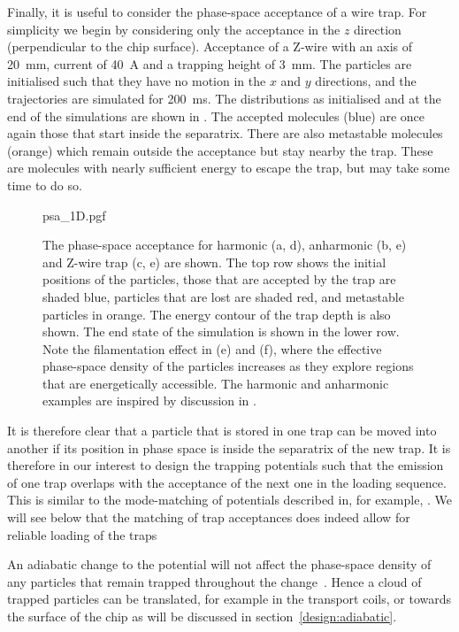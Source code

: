 Finally, it is useful to consider the phase-space acceptance of a wire trap.
For simplicity we begin by considering only the acceptance in the $z$ direction
(perpendicular to the chip surface). Acceptance of a Z-wire with an axis of
\SI{20}{\milli\meter}, current of \SI{40}{\ampere} and a trapping height of
\SI{3}{\milli\meter}. The particles are initialised such that they have no
motion in the $x$ and $y$ directions, and the trajectories are simulated for
\SI{200}{\milli\second}. The distributions as initialised and at the end of the
simulations are shown in . The accepted
molecules (blue) are once again those that start inside the separatrix. There are
also metastable molecules (orange) which remain outside the acceptance but stay
nearby the trap. These are molecules with nearly sufficient energy to escape
the trap, but may take some time to do so.

\begin{figure}[htb]
  \centering
  {psa_1D.pgf}
  \caption{
    The phase-space acceptance for harmonic (a, d), anharmonic (b, e) and
    Z-wire trap (c, e) are shown. The top row shows the initial positions of
    the particles, those that are accepted by the trap are shaded blue,
    particles that are lost are shaded red, and metastable particles in orange.
    The energy contour of the trap depth is also shown. The end state of the
    simulation is shown in the lower row. Note the filamentation effect in (e)
    and (f), where the effective phase-space density of the particles increases
    as they explore regions that are energetically accessible. The harmonic and
    anharmonic examples are inspired by discussion in
    .
  }
  \label{design:fig:psaeg}
\end{figure}

It is therefore clear that a particle that is stored in one trap can be moved
into another if its position in phase space is inside the separatrix of the new
trap. It is therefore in our interest to design the trapping potentials such
that the emission of one trap overlaps with the acceptance of the next one in
the loading sequence. This is similar to the mode-matching of potentials
described in, for example, . We will see below that the
matching of trap acceptances does indeed allow for reliable loading of the
traps

An adiabatic change to the potential will not affect the phase-space density of
any particles that remain trapped throughout the change~\cite{Hand1998,
Lichtenberg1969}. Hence a cloud of trapped particles can be translated, for
example in the transport coils, or towards the surface of the chip as will be
discussed in section~\ref{design:adiabatic}.

